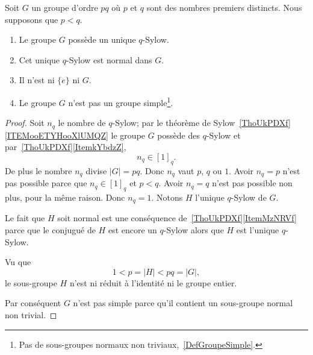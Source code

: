 \begin{lemma}
    Soit \( G\) un groupe d'ordre \( pq\) où \( p\) et \( q\) sont des nombres premiers distincts. Nous supposons que \( p<q\).
    \begin{enumerate}
        \item
            Le groupe \( G\) possède un unique \( q\)-Sylow.
        \item
            Cet unique \( q\)-Sylow est normal dans \( G\).
        \item
            Il n'est ni \( \{ e \}\) ni \( G\).
        \item
            Le groupe \( G\) n'est pas un groupe simple\footnote{Pas de sous-groupes normaux non triviaux,~\ref{DefGroupeSimple}.}.
    \end{enumerate}
\end{lemma}

\begin{proof}
    Soit \( n_q\) le nombre de \( q\)-Sylow; par le théorème de Sylow~\ref{ThoUkPDXf}\ref{ITEMooETYHooXlUMQZ} le groupe \( G\) possède des \( q\)-Sylow et par~\ref{ThoUkPDXf}\ref{ItemkYbdzZ},
    \begin{equation}
        n_q\in[1]_q.
    \end{equation}
    De plus le nombre \( n_q\) divise \( | G |=pq\). Donc \( n_q\) vaut \( p\), \( q\) ou \( 1\). Avoir \( n_q=p\) n'est pas possible parce que \( n_q\in[1]_q\) et \( p<q\). Avoir \( n_q=q\) n'est pas possible non plus, pour la même raison. Donc \( n_q=1\). Notons \( H\) l'unique \( q\)-Sylow de \( G\).

    Le fait que \( H\) soit normal est une conséquence de~\ref{ThoUkPDXf}\ref{ItemMzNRVf} parce que le conjugué de \( H\) est encore un \( q\)-Sylow alors que \( H\) est l'unique \( q\)-Sylow.

    Vu que
    \begin{equation}
        1<p=| H |<pq=| G |,
    \end{equation}
    le sous-groupe \( H \) n'est ni réduit à l'identité ni le groupe entier.

    Par conséquent \( G\) n'est pas simple parce qu'il contient un sous-groupe normal non trivial.
\end{proof}

